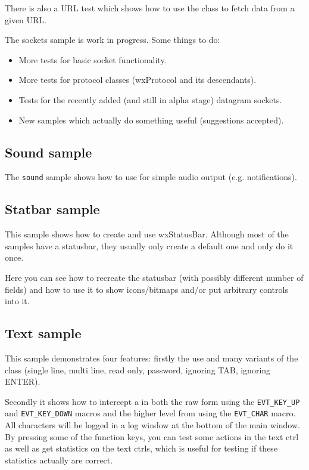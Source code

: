 There is also a URL test which shows how to use
the  class to fetch data from a given URL.

The sockets sample is work in progress. Some things to do:

\begin{itemize}\itemsep=0pt
\item More tests for basic socket functionality.
\item More tests for protocol classes (wxProtocol and its descendants).
\item Tests for the recently added (and still in alpha stage) datagram sockets.
\item New samples which actually do something useful (suggestions accepted).
\end{itemize}


\subsection{Sound sample}\label{samplesound}

The {\tt sound} sample shows how to use  for simple
audio output (e.g. notifications).


\subsection{Statbar sample}\label{samplestatbar}

This sample shows how to create and use wxStatusBar. Although most of the
samples have a statusbar, they usually only create a default one and only
do it once.

Here you can see how to recreate the statusbar (with possibly different number
of fields) and how to use it to show icons/bitmaps and/or put arbitrary
controls into it.


\subsection{Text sample}\label{sampletext}

This sample demonstrates four features: firstly the use and many variants of
the  class (single line, multi line, read only,
password, ignoring TAB, ignoring ENTER).

Secondly it shows how to intercept a  in both
the raw form using the {\tt EVT\_KEY\_UP} and {\tt EVT\_KEY\_DOWN} macros and the
higher level from using the {\tt EVT\_CHAR} macro. All characters will be logged
in a log window at the bottom of the main window. By pressing some of the function
keys, you can test some actions in the text ctrl as well as get statistics on the
text ctrls, which is useful for testing if these statistics actually are correct.

